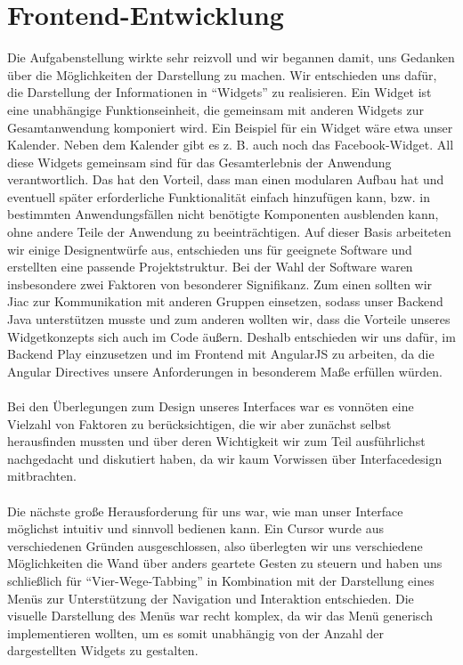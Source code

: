 \documentclass[10pt,a4paper]{report}
\begin{document}
\section{Frontend-Entwicklung}
	Die Aufgabenstellung wirkte sehr reizvoll und wir begannen damit, uns Gedanken über die Mög\-lich\-kei\-ten der Darstellung zu machen. Wir entschieden uns dafür, die Darstellung der Informationen in "`Widgets"' zu realisieren. Ein Widget ist eine unabhängige Funktionseinheit, die gemeinsam mit anderen Widgets zur Gesamtanwendung komponiert wird. Ein Beispiel für ein Widget wäre etwa unser Kalender. Neben dem Kalender gibt es z. B. auch noch das Facebook-Widget. All diese Widgets gemeinsam sind für das Gesamterlebnis der Anwendung verantwortlich. Das hat den Vorteil, dass man einen modularen Aufbau hat und eventuell später erforderliche Funktionalität einfach hinzufügen kann, bzw. in bestimmten Anwendungsfällen nicht benötigte Komponenten ausblenden kann, ohne andere Teile der Anwendung zu beeinträchtigen. Auf dieser Basis arbeiteten wir einige Designentwürfe aus, entschieden uns für geeignete Software und erstellten eine passende Projektstruktur. Bei der Wahl der Software waren insbesondere zwei Faktoren von besonderer Signifikanz. Zum einen sollten wir Jiac zur Kommunikation mit anderen Gruppen einsetzen, sodass unser Backend Java unterstützen musste und zum anderen wollten wir, dass die Vorteile unseres Widgetkonzepts sich auch im Code äußern. Deshalb entschieden wir uns dafür, im Backend Play einzusetzen und im Frontend mit AngularJS zu arbeiten, da die Angular Directives unsere Anforderungen in besonderem Maße erfüllen würden.\\\\
	Bei den Überlegungen zum Design unseres Interfaces war es vonnöten eine Vielzahl von Faktoren zu berücksichtigen, die wir aber zunächst selbst herausfinden mussten und über deren Wichtigkeit wir zum Teil ausführlichst nachgedacht und diskutiert haben, da wir kaum Vorwissen über Interfacedesign mitbrachten.\\\\
	Die nächste große Herausforderung für uns war, wie man unser Interface möglichst intuitiv und sinnvoll bedienen kann. Ein Cursor wurde aus verschiedenen Gründen ausgeschlossen, also über\-leg\-ten wir uns verschiedene Möglichkeiten die Wand über anders geartete Gesten zu steuern und haben uns schließlich für "`Vier-Wege-Tabbing"' in Kombination mit der Darstellung eines Menüs zur Unterstützung der Navigation und Interaktion entschieden. Die visuelle Darstellung des Menüs war recht komplex, da wir das Menü generisch implementieren wollten, um es somit unabhängig von der Anzahl der dargestellten Widgets zu gestalten.\\\\
\end{document}
